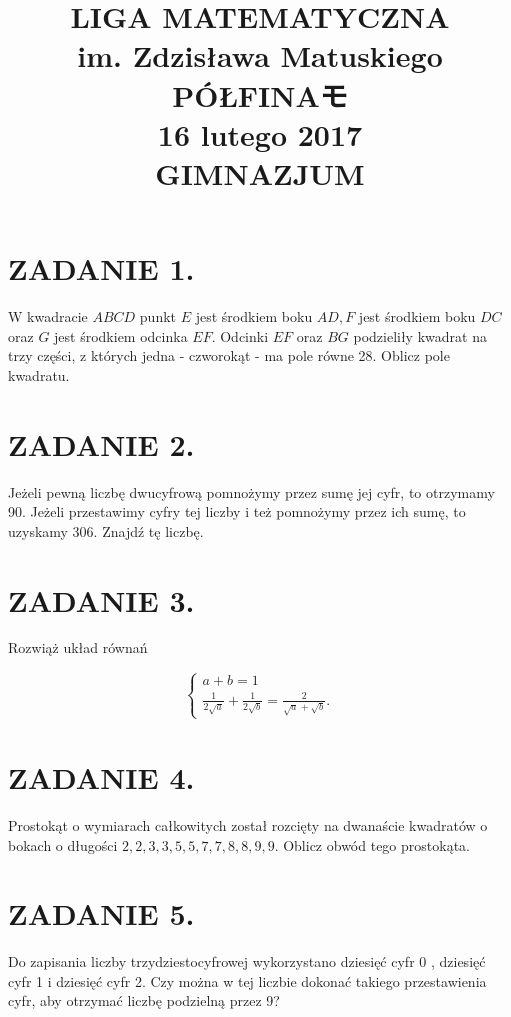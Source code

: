 \documentclass[10pt]{article}
\title{LIGA MATEMATYCZNA \\
 im. Zdzisława Matuskiego \\
 PÓŁFINAモ \\
 16 lutego 2017 \\
 GIMNAZJUM }
\author{}
\date{}
\begin{document}
\maketitle
\section*{ZADANIE 1.}
W kwadracie \(A B C D\) punkt \(E\) jest środkiem boku \(A D, F\) jest środkiem boku \(D C\) oraz \(G\) jest środkiem odcinka \(E F\). Odcinki \(E F\) oraz \(B G\) podzieliły kwadrat na trzy części, z których jedna - czworokąt - ma pole równe 28. Oblicz pole kwadratu.

\section*{ZADANIE 2.}
Jeżeli pewną liczbę dwucyfrową pomnożymy przez sumę jej cyfr, to otrzymamy 90. Jeżeli przestawimy cyfry tej liczby i też pomnożymy przez ich sumę, to uzyskamy 306. Znajdź tę liczbę.

\section*{ZADANIE 3.}
Rozwiąż układ równań

\[
\left\{\begin{array}{l}
a+b=1 \\
\frac{1}{2 \sqrt{a}}+\frac{1}{2 \sqrt{b}}=\frac{2}{\sqrt{a}+\sqrt{b}} .
\end{array}\right.
\]

\section*{ZADANIE 4.}
Prostokąt o wymiarach całkowitych został rozcięty na dwanaście kwadratów o bokach o długości \(2,2,3,3,5,5,7,7,8,8,9,9\). Oblicz obwód tego prostokąta.

\section*{ZADANIE 5.}
Do zapisania liczby trzydziestocyfrowej wykorzystano dziesięć cyfr 0 , dziesięć cyfr 1 i dziesięć cyfr 2. Czy można w tej liczbie dokonać takiego przestawienia cyfr, aby otrzymać liczbę podzielną przez 9?
\end{document}
